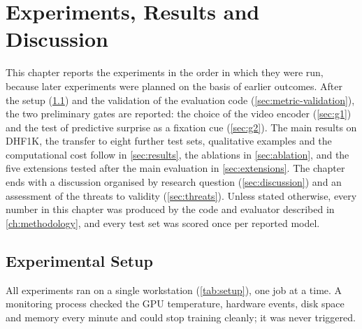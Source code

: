 \chapter{Experiments, Results and Discussion}\label{ch:experiments}


This chapter reports the experiments in the order in which they were run,
because later experiments were planned on the basis of earlier outcomes. After
the setup (\cref{sec:setup}) and the validation of the evaluation code
(\cref{sec:metric-validation}), the two preliminary gates are reported: the
choice of the video encoder (\cref{sec:g1}) and the test of predictive surprise
as a fixation cue (\cref{sec:g2}). The main results on DHF1K, the transfer to
eight further test sets, qualitative examples and the computational cost follow
in \cref{sec:results}, the ablations in \cref{sec:ablation}, and the five
extensions tested after the main evaluation in \cref{sec:extensions}. The chapter
ends with a discussion organised by research question (\cref{sec:discussion})
and an assessment of the threats to validity (\cref{sec:threats}). Unless stated
otherwise, every number in this chapter was produced by the code and evaluator
described in \cref{ch:methodology}, and every test set was scored once per
reported model.

\section{Experimental Setup}\label{sec:setup}

All experiments ran on a single workstation (\cref{tab:setup}), one job at a
time. A monitoring process checked the \acrshort{GPU} temperature, hardware events, disk
space and memory every minute and could stop training cleanly; it was never
triggered.

